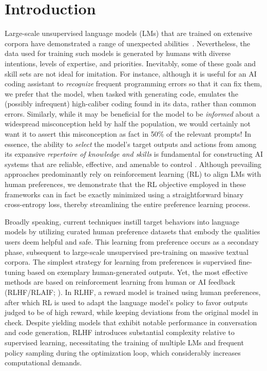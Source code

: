 \section{Introduction}
Large-scale unsupervised language models (LMs) that are trained on extensive corpora have demonstrated a range of unexpected abilities~\citep{chowdhery2022palm, brown2020language, touvron2023llama, bubeck2023sparks}. Nevertheless, the data used for training such models is generated by humans with diverse intentions, levels of expertise, and priorities. Inevitably, some of these goals and skill sets are not ideal for imitation. For instance, although it is useful for an AI coding assistant to \textit{recognize} frequent programming errors so that it can fix them, we prefer that the model, when tasked with generating code, emulates the (possibly infrequent) high-caliber coding found in its data, rather than common errors. Similarly, while it may be beneficial for the model to be \textit{informed} about a widespread misconception held by half the population, we would certainly not want it to assert this misconception as fact in 50\% of the relevant prompts! In essence, the ability to \emph{select} the model’s target outputs and actions from among its expansive \textit{repertoire of knowledge and skills} is fundamental for constructing AI systems that are reliable, effective, and amenable to control \citep{ouyang2022training}. Although prevailing approaches predominantly rely on reinforcement learning (RL) to align LMs with human preferences, we demonstrate that the RL objective employed in these frameworks can in fact be exactly minimized using a straightforward binary cross-entropy loss, thereby streamlining the entire preference learning process.

Broadly speaking, current techniques instill target behaviors into language models by utilizing curated human preference datasets that embody the qualities users deem helpful and safe. This learning from preference occurs as a secondary phase, subsequent to large-scale unsupervised pre-training on massive textual corpora. The simplest strategy for learning from preferences is supervised fine-tuning based on exemplary human-generated outputs. Yet, the most effective methods are based on reinforcement learning from human or AI feedback (RLHF/RLAIF; \citep{christiano2017deep,bai2022constitutional}). In RLHF, a reward model is trained using human preferences, after which RL is used to adapt the language model's policy to favor outputs judged to be of high reward, while keeping deviations from the original model in check. Despite yielding models that exhibit notable performance in conversation and code generation, RLHF introduces substantial complexity relative to supervised learning, necessitating the training of multiple LMs and frequent policy sampling during the optimization loop, which considerably increases computational demands.

